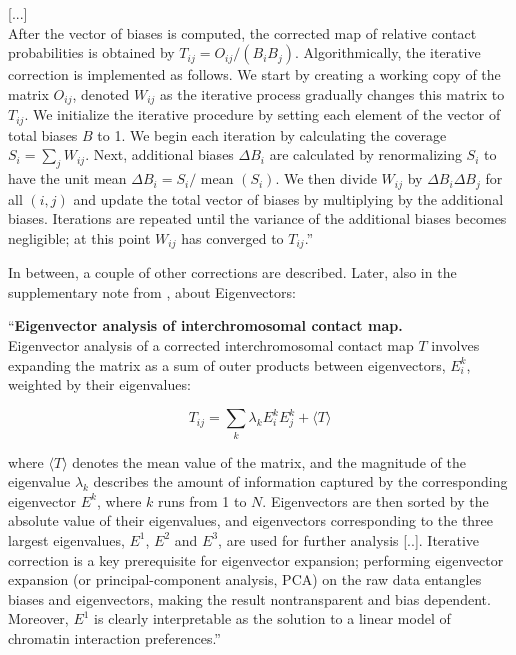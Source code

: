[...] \\
After the vector of biases is computed, the corrected map of relative
contact probabilities is obtained by $T_{ij} = O_{ij} / (B_i B_j)$.
Algorithmically, the iterative correction is implemented as follows. We start
by creating a working copy of the matrix $O_{ij}$, denoted $W_{ij}$ as the
iterative process gradually changes this matrix to $T_{ij}$. We initialize the
iterative procedure by setting each element of the vector of total biases $B$
to 1. We begin each iteration by calculating the coverage $S_i = \sum_j
W_{ij}$. Next, additional biases $\Delta B_i$ are calculated by renormalizing
$S_i$ to have the unit mean $\Delta B_i = S_i /$ mean $(S_i)$. We then divide
$W_{ij}$ by $\Delta B_i \Delta B_j$ for all $(i, j)$ and update the total
vector of biases by multiplying by the additional biases. Iterations are
repeated until the variance of the additional biases becomes negligible; at
this point $W_{ij}$ has converged to $T_{ij}$.'' \\

\newpage

In between, a couple of other corrections are described. Later, also in the
supplementary note from \cite{imakaev2012iterative}, about Eigenvectors:



``\textbf{Eigenvector analysis of interchromosomal contact map.} \\
Eigenvector analysis of a corrected interchromosomal contact map $T$ involves
expanding the matrix as a sum of outer products between eigenvectors, $E^k_i$,
weighted by their eigenvalues:

$$ T_{ij} = \sum_k \lambda_k E^k_i E^k_j + \langle T \rangle$$

where $\langle T \rangle$ denotes the mean value of the matrix, and the
magnitude of the eigenvalue $\lambda_k$ describes the amount of information
captured by the corresponding eigenvector $E^k$, where $k$ runs from 1 to $N$.
Eigenvectors are then sorted by the absolute value of their eigenvalues, and
eigenvectors corresponding to the three largest eigenvalues, $E^1$, $E^2$ and
$E^3$, are used for further analysis [..]. Iterative correction is a key
prerequisite for eigenvector expansion; performing eigenvector expansion (or
principal-component analysis, PCA) on the raw data entangles biases and
eigenvectors, making the result nontransparent and bias dependent. Moreover,
$E^1$ is clearly interpretable as the solution to a linear model of chromatin
interaction preferences.''





